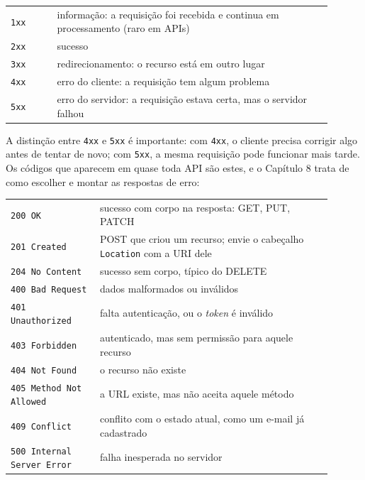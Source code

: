 \begin{center}
\begin{tabular}{@{}P{0.13\linewidth}P{0.77\linewidth}@{}}
\toprule
{}
 &  \\
\midrule
\texttt{1xx} & informação: a requisição foi recebida e continua em processamento (raro em APIs) \\
 \texttt{2xx} & sucesso \\
\texttt{3xx} & redirecionamento: o recurso está em outro lugar \\
 \texttt{4xx} & erro do cliente: a requisição tem algum problema \\
\texttt{5xx} & erro do servidor: a requisição estava certa, mas o servidor falhou \\
\bottomrule
\end{tabular}
\end{center}

A distinção entre \texttt{4xx} e \texttt{5xx} é importante: com \texttt{4xx}, o cliente precisa corrigir algo antes de tentar de novo; com \texttt{5xx}, a mesma requisição pode funcionar mais tarde. Os códigos que aparecem em quase toda API são estes, e o Capítulo 8 trata de como escolher e montar as respostas de erro:

\begin{center}
\begin{tabular}{@{}P{0.25\linewidth}P{0.65\linewidth}@{}}
\toprule
{}
 &  \\
\midrule
\texttt{200 OK} & sucesso com corpo na resposta: GET, PUT, PATCH \\
 \texttt{201 Created} & POST que criou um recurso; envie o cabeçalho \texttt{Location} com a URI dele \\
\texttt{204 No Content} & sucesso sem corpo, típico do DELETE \\
 \texttt{400 Bad Request} & dados malformados ou inválidos \\
\texttt{401 Unauthorized} & falta autenticação, ou o \textit{token} é inválido \\
 \texttt{403 Forbidden} & autenticado, mas sem permissão para aquele recurso \\
\texttt{404 Not Found} & o recurso não existe \\
 \texttt{405 Method Not Allowed} & a URL existe, mas não aceita aquele método \\
\texttt{409 Conflict} & conflito com o estado atual, como um e-mail já cadastrado \\
 \texttt{500 Internal Server Error} & falha inesperada no servidor \\
\bottomrule
\end{tabular}
\end{center}

